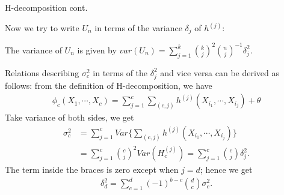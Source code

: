 \documentclass{beamer}
\theoremstyle{definition}
\numberwithin{Def}{section}
\begin{document}
    
\begin{frame}{H-decomposition cont.}
\begin{fontsize}{7}{12}
     Now we try to write $U_n$ in terms of the variance $\delta_j$ of $h^{(j)}$: 
    \begin{theorem}
The variance of $U_n$ is given by 
       $ var(U_n) = \sum_{j=1}^k {k \choose j}^2 {n \choose j}^{-1}\delta_j^2$.
    \end{theorem}
    Relations describing $\sigma_{c}^2$ in terms of the $\delta_j^2 $ and vice versa can be derived as follows: from the definition of H-decomposition, we have 
    \begin{align*}
        \phi_c (X_1, \cdots, X_c) = \sum_{j = 1}^c \sum_{(c,j)} h^{(j)} (X_{i_{1}}, \cdots , X_{i_j}) + \theta
    \end{align*}
     Take variance of both sides,  we get 
    \begin{align*}
        \sigma_{c}^2 &= \sum_{j = 1}^c Var\{ \sum_{(c, j)} h^{(j)} (X_{i_{1}}, \cdots , X_{i_j})\} \\
        &= \sum_{j = 1}^c {c \choose j}^2 Var( H_c^{(j)}) 
        = \sum_{j = 1}^c {c \choose j} \delta_j^2.
    \end{align*}
    The term inside the braces is zero except when $j = d$; hence we get 
    \begin{align*}
        \delta_d^2 = \sum_{c = 1}^d (-1)^{b-c} {d \choose c} \sigma_{c}^2.
    \end{align*}
    \end{fontsize}
    \end{frame}
\end{document}
